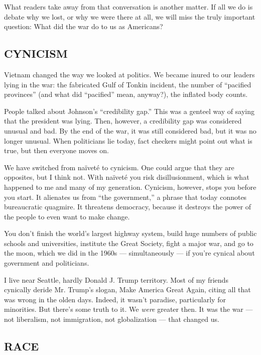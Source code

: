 What readers take away from that conversation is another matter. If all
we do is debate why we lost, or why we were there at all, we will miss
the truly important question: What did the war do to us as Americans?

\hypertarget{cynicism}{%
\subsection{\texorpdfstring{\textbf{CYNICISM}}{CYNICISM}}\label{cynicism}}

Vietnam changed the way we looked at politics. We became inured to our
leaders lying in the war: the fabricated Gulf of Tonkin incident, the
number of ``pacified provinces'' (and what did ``pacified'' mean,
anyway?), the inflated body counts.

People talked about Johnson's ``credibility gap.'' This was a genteel
way of saying that the president was lying. Then, however, a credibility
gap was considered unusual and bad. By the end of the war, it was still
considered bad, but it was no longer unusual. When politicians lie
today, fact checkers might point out what is true, but then everyone
moves on.

We have switched from naïveté to cynicism. One could argue that they are
opposites, but I think not. With naïveté you risk disillusionment, which
is what happened to me and many of my generation. Cynicism, however,
stops you before you start. It alienates us from ``the government,'' a
phrase that today connotes bureaucratic quagmire. It threatens
democracy, because it destroys the power of the people to even want to
make change.

You don't finish the world's largest highway system, build huge numbers
of public schools and universities, institute the Great Society, fight a
major war, and go to the moon, which we did in the 1960s ---
simultaneously --- if you're cynical about government and politicians.

I live near Seattle, hardly Donald J. Trump territory. Most of my
friends cynically deride Mr. Trump's slogan, Make America Great Again,
citing all that was wrong in the olden days. Indeed, it wasn't paradise,
particularly for minorities. But there's some truth to it. We
\emph{were} greater then. It was the war --- not liberalism, not
immigration, not globalization --- that changed us.

\hypertarget{race}{%
\subsection{\texorpdfstring{\textbf{RACE}}{RACE}}\label{race}}

